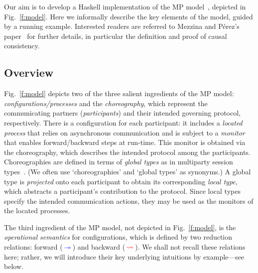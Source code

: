 \documentclass[runningheads,plain]{llncs}
\begin{document}
Our aim is to develop a Haskell implementation of the MP model~\cite{DBLP:conf/ppdp/MezzinaP17}, depicted in Fig.~\ref{f:model}. 
Here we  informally describe the key elements of the model, guided by a running example. Interested readers are referred to Mezzina and P\'erez's paper~\cite{DBLP:conf/ppdp/MezzinaP17} for further details, in particular the definition and proof of causal consistency. 

\subsection{Overview}
Fig.~\ref{f:model} depicts two of the three salient ingredients of the MP model:
\emph{configurations/processes} and the
\emph{choreography}, which represent the communicating partners (\emph{participants}) and their intended governing protocol, respectively. 
There is a {configuration} for each participant: it includes a \emph{located process} that relies on asynchronous communication and is subject to a \emph{monitor} that enables forward/backward steps at run-time. This monitor is obtained via the choreography, which describes the intended protocol among the {participants}. 
Choreographies are defined in terms of \emph{global types} as in multiparty session types~\cite{DBLP:conf/popl/HondaYC08}. 
(We often use `choreographies' and `global types' as synonyms.)
A global type is \emph{projected} onto each participant to obtain 
its corresponding  \emph{local type}, which abstracts a participant's contribution to the protocol. 
Since  local types specify the intended communication actions, they may be used as the monitors of the located processes. 

The third ingredient of the MP model, not depicted in Fig.~\ref{f:model}, is the \emph{operational semantics} for configurations, which  is defined by two reduction relations: forward ($\textcolor{blue}{\,\twoheadrightarrow\,}$) and backward ($\textcolor{red}{\,\rightsquigarrow\,}$). We shall not recall these relations here; rather, we will introduce their key underlying intuitions by example---see  below.
\end{document}
